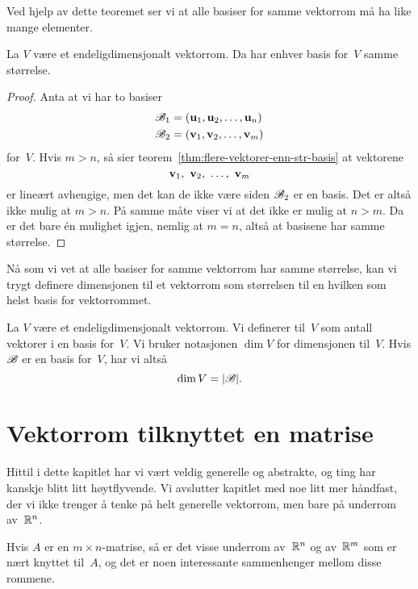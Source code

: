 Ved hjelp av dette teoremet ser vi at alle basiser for samme vektorrom
må ha like mange elementer.

\begin{thm}
\label{thm:basis-str-invariant}
La $V$ være et endeligdimensjonalt vektorrom.  Da har enhver basis
for~$V$ samme størrelse.
\end{thm}
\begin{proof}
Anta at vi har to basiser
\begin{align*}
\mathscr{B}_1 &= (\mathbf{u}_1, \mathbf{u}_2, \ldots, \mathbf{u}_n) \\
\mathscr{B}_2 &= (\mathbf{v}_1, \mathbf{v}_2, \ldots, \mathbf{v}_m)
\end{align*}
for~$V$.  Hvis $m > n$, så sier
teorem~\ref{thm:flere-vektorer-enn-str-basis} at vektorene
\[
\v_1,\ \v_2,\ \ldots,\ \v_m
\]
er lineært avhengige, men det kan de ikke være siden $\mathscr{B}_2$ er en
basis.  Det er altså ikke mulig at $m > n$.  På samme måte viser vi at
det ikke er mulig at $n > m$.  Da er det bare én mulighet igjen,
nemlig at $m = n$, altså at basisene har samme størrelse.
\end{proof}

Nå som vi vet at alle basiser for samme vektorrom har samme størrelse,
kan vi trygt definere dimensjonen til et vektorrom som størrelsen til
en hvilken som helst basis for vektorrommet.

\begin{defn}
La $V$ være et endeligdimensjonalt vektorrom.  Vi definerer
 til~$V$ som antall vektorer i en basis for~$V$.
Vi bruker notasjonen $\dim V$ for dimensjonen til~$V$.  Hvis $\mathscr{B}$ er
en basis for~$V$, har vi altså
\[
\dim V = |\mathscr{B}|.\qedhere
\]
\end{defn}



\section*{Vektorrom tilknyttet en matrise}

Hittil i dette kapitlet har vi vært veldig generelle og abstrakte, og
ting har kanskje blitt litt høytflyvende.  Vi avslutter kapitlet med
noe litt mer håndfast, der vi ikke trenger å tenke på helt generelle
vektorrom, men bare på underrom av~$\mathbb{R}^n$.

Hvis $A$ er en $m \times n$-matrise, så er det visse underrom
av~$\mathbb{R}^n$ og av~$\mathbb{R}^m$ som er nært knyttet til~$A$, og det er noen
interessante sammenhenger mellom disse rommene.

